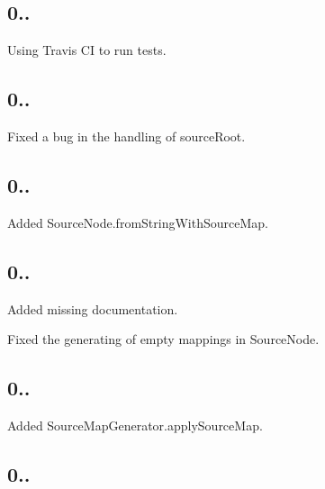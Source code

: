 \subsection*{0..}


\begin{DoxyItemize}
\item Using Travis CI to run tests.
\end{DoxyItemize}

\subsection*{0..}


\begin{DoxyItemize}
\item Fixed a bug in the handling of source\+Root.
\end{DoxyItemize}

\subsection*{0..}


\begin{DoxyItemize}
\item Added Source\+Node.\+from\+String\+With\+Source\+Map.
\end{DoxyItemize}

\subsection*{0..}


\begin{DoxyItemize}
\item Added missing documentation.
\item Fixed the generating of empty mappings in Source\+Node.
\end{DoxyItemize}

\subsection*{0..}


\begin{DoxyItemize}
\item Added Source\+Map\+Generator.\+apply\+Source\+Map.
\end{DoxyItemize}

\subsection*{0..}


